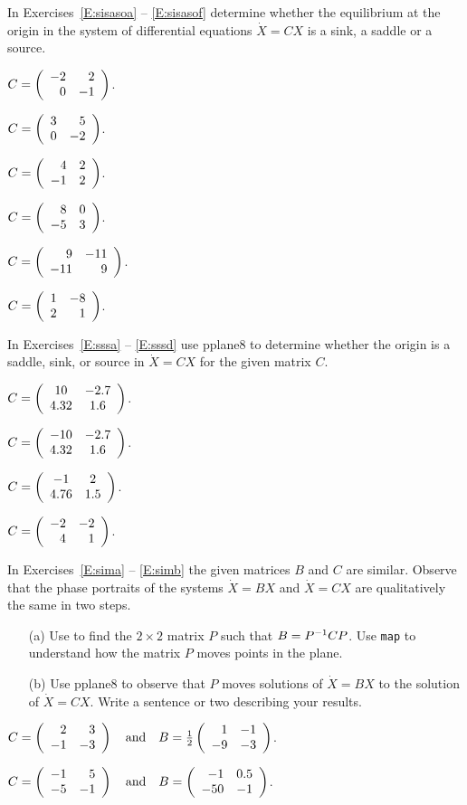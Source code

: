\documentclass{ximera}
\begin{document}
\noindent In Exercises~\ref{E:sisasoa} -- \ref{E:sisasof} determine
whether the equilibrium at the origin in the system of differential
equations $\dot{X}=CX$ is a sink, a saddle or a source.
\begin{exercise} \label{E:sisasoa}
$C=\left(\begin{array}{rr} -2 & 2\\ 0 &-1\end{array}\right)$.
\end{exercise}
\begin{exercise} \label{E:sisasob}
$C=\left(\begin{array}{rr} 3 & 5\\ 0 &-2\end{array}\right)$.
\end{exercise}
\begin{exercise} \label{E:sisasoc}
$C=\left(\begin{array}{rr} 4 & 2\\ -1 &2\end{array}\right)$.
\end{exercise}
\begin{exercise} \label{E:sisasod}
$C=\left(\begin{array}{rr} 8 & 0\\ -5 &3\end{array}\right)$.
\end{exercise}
\begin{exercise} \label{E:sisasoe}
$C=\left(\begin{array}{rr} 9 & -11\\ -11 &9\end{array}\right)$.
\end{exercise}
\begin{exercise} \label{E:sisasof}
$C=\left(\begin{array}{rr} 1 & -8\\ 2 &1\end{array}\right)$.
\end{exercise}

\CEXER

\noindent In Exercises~\ref{E:sssa} -- \ref{E:sssd} use {\sf pplane8} to
determine whether the origin is a saddle, sink, or source in $\dot{X}=CX$
for the given matrix $C$.
\begin{exercise} \label{E:sssa}
$C=\left(\begin{array}{cc} 10 & -2.7\\ 4.32 &1.6\end{array}\right)$.
\end{exercise}
\begin{exercise} \label{E:sssb}
$C=\left(\begin{array}{cc} -10 & -2.7\\ 4.32 &1.6\end{array}\right)$.
\end{exercise}
\begin{exercise} \label{E:sssc}
$C=\left(\begin{array}{cc} -1 & 2\\ 4.76 &1.5\end{array}\right)$.
\end{exercise}
\begin{exercise} \label{E:sssd}
$C=\left(\begin{array}{rr} -2 & -2\\ 4 &1\end{array}\right)$.
\end{exercise}


\noindent In Exercises~\ref{E:sima} -- \ref{E:simb} the given matrices $B$
and $C$ are similar.  Observe that the phase portraits of the systems
$\dot{X}=BX$ and $\dot{X}=CX$ are qualitatively the same in two steps.
\begin{itemize}
\item[(a)]  Use \Matlab to find the $2\times 2$ matrix $P$ such that
$B=P^{-1} CP$.  Use {\tt map} to understand how the matrix $P$ moves points 
in the plane.
\item[(b)]  Use {\sf pplane8} to observe that $P$ moves solutions of
$\dot{X}=BX$ to the solution of $\dot{X}=CX$.  Write a sentence or two describing your results.
\end{itemize}
\begin{exercise} \label{E:sima}
$C = \left(\begin{array}{rr} 2 & 3\\ -1 &-3\end{array}\right) \quad\mbox{and}\quad B = \frac{1}{2}\left(\begin{array}{rr} 1 & -1\\ -9 &-3\end{array}\right)$.
\end{exercise}
\begin{exercise} \label{E:simb}
$C = \left(\begin{array}{rr} -1 & 5\\ -5 &-1\end{array}\right) \quad\mbox{and}\quad B = \left(\begin{array}{rr} -1 & 0.5\\ -50 &-1\end{array}\right)$.
\end{exercise}
\end{document}
